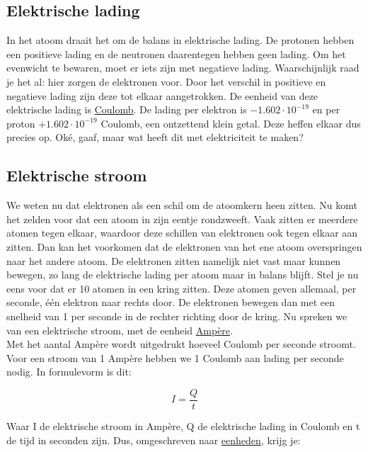 \subsection{Elektrische lading}
In het atoom draait het om de balans in elektrische lading. De protonen hebben een positieve lading en de neutronen daarentegen hebben geen lading. Om het evenwicht te bewaren, moet er iets zijn met negatieve lading. Waarschijnlijk raad je het al: hier zorgen de elektronen voor. Door het verschil in positieve en negatieve lading zijn deze tot elkaar aangetrokken. De eenheid van deze elektrische lading is \href{https://nl.wikipedia.org/wiki/Coulomb_(eenheid)}{Coulomb}. De lading per elektron is $-1.602 \cdot 10^{-19}$ en per proton $+1.602 \cdot 10^{-19}$ Coulomb, een ontzettend klein getal. Deze heffen elkaar dus precies op. Oké, gaaf, maar wat heeft dit met elektriciteit te maken? 

\subsection{Elektrische stroom}
We weten nu dat elektronen als een schil om de atoomkern heen zitten. Nu komt het zelden voor dat een atoom in zijn eentje rondzweeft. Vaak zitten er meerdere atomen tegen elkaar, waardoor deze schillen van elektronen ook tegen elkaar aan zitten. Dan kan het voorkomen dat de elektronen van het ene atoom overspringen naar het andere atoom. De elektronen zitten namelijk niet vast maar kunnen bewegen, zo lang de elektrische lading per atoom maar in balans blijft. Stel je nu eens voor dat er 10 atomen in een kring zitten. Deze atomen geven allemaal, per seconde, één elektron naar rechts door. De elektronen bewegen dan met een snelheid van 1 per seconde in de rechter richting door de kring. Nu spreken we van een elektrische stroom, met de eenheid \href{https://en.wikipedia.org/wiki/Ampere}{Ampère}. \\

Met het aantal Ampère wordt uitgedrukt hoeveel Coulomb per seconde stroomt. Voor een stroom van 1 Ampère hebben we 1 Coulomb aan lading per seconde nodig. In formulevorm is dit:

\begin{equation}
	I = \frac{Q}{t}
\end{equation}

Waar I de elektrische stroom in Ampère, Q de elektrische lading in Coulomb en t de tijd in seconden zijn. Dus, omgeschreven naar \href{https://nl.wikipedia.org/wiki/Natuurkundige_grootheden_en_eenheden}{eenheden}, krijg je:


